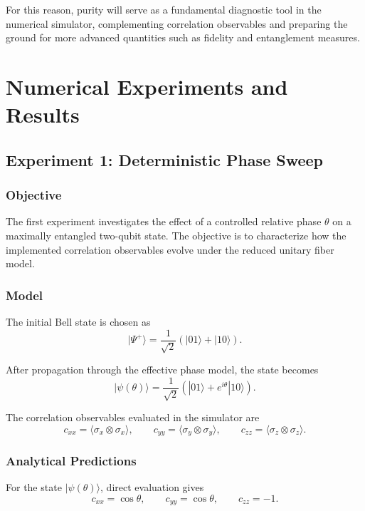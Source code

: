 \documentclass[a4paper]{article}
\begin{document}
For this reason, purity will serve as a fundamental diagnostic tool in the numerical simulator, complementing correlation observables and preparing the ground for more advanced quantities such as fidelity and entanglement measures.


\section{Numerical Experiments and Results}

\subsection{Experiment 1: Deterministic Phase Sweep}

\subsubsection{Objective}

The first experiment investigates the effect of a controlled relative phase \(\theta\) on a maximally entangled two-qubit state. The objective is to characterize how the implemented correlation observables evolve under the reduced unitary fiber model.

\subsubsection{Model}

The initial Bell state is chosen as
\[
|\Psi^{+}\rangle
=
\frac{1}{\sqrt{2}}
\left(
|01\rangle + |10\rangle
\right).
\]

After propagation through the effective phase model, the state becomes
\[
|\psi(\theta)\rangle
=
\frac{1}{\sqrt{2}}
\left(
|01\rangle + e^{i\theta}|10\rangle
\right).
\]

The correlation observables evaluated in the simulator are
\[
c_{xx} = \langle \sigma_x \otimes \sigma_x \rangle,\qquad
c_{yy} = \langle \sigma_y \otimes \sigma_y \rangle,\qquad
c_{zz} = \langle \sigma_z \otimes \sigma_z \rangle.
\]

\subsubsection{Analytical Predictions}

For the state \( |\psi(\theta)\rangle \), direct evaluation gives
\[
c_{xx} = \cos\theta,\qquad
c_{yy} = \cos\theta,\qquad
c_{zz} = -1.
\]
\end{document}
